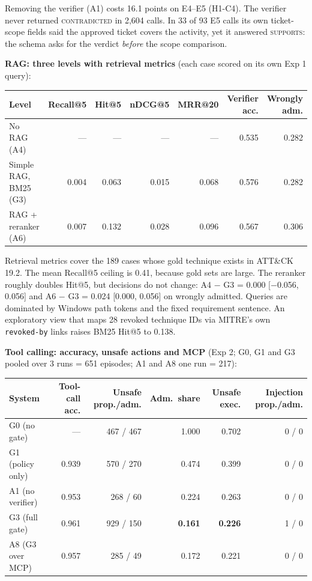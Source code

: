 \documentclass[11pt,a4paper]{article}
\newcommand{\code}[1]{\texttt{\small #1}}
\begin{document}
Removing the verifier (A1) costs 16.1 points on E4--E5 (H1-C4). The verifier never returned \textsc{contradicted} in 2,604 calls. In 33 of 93 E5 calls its own ticket-scope fields said the approved ticket covers the activity, yet it answered \textsc{supports}: the schema asks for the verdict \emph{before} the scope comparison.

\textbf{RAG: three levels with retrieval metrics} (each case scored on its own Exp 1 query):

{\small
\begin{tabularx}{\linewidth}{@{}Lrrrrrr@{}}
\toprule
\textbf{Level} & \textbf{Recall@5} & \textbf{Hit@5} & \textbf{nDCG@5} & \textbf{MRR@20} & \textbf{Verifier acc.} & \textbf{Wrongly adm.}\\
\midrule
No RAG (A4) & --- & --- & --- & --- & 0.535 & 0.282 \\
Simple RAG, BM25 (G3) & 0.004 & 0.063 & 0.015 & 0.068 & 0.576 & 0.282 \\
RAG + reranker (A6) & 0.007 & 0.132 & 0.028 & 0.096 & 0.567 & 0.306 \\
\bottomrule
\end{tabularx}}

Retrieval metrics cover the 189 cases whose gold technique exists in ATT\&CK 19.2. The mean Recall@5 ceiling is 0.41, because gold sets are large. The reranker roughly doubles Hit@5, but decisions do not change: A4 $-$ G3 = 0.000 [$-$0.056, 0.056] and A6 $-$ G3 = 0.024 [0.000, 0.056] on wrongly admitted. Queries are dominated by Windows path tokens and the fixed requirement sentence. An exploratory view that maps 28 revoked technique IDs via MITRE's own \code{revoked-by} links raises BM25 Hit@5 to 0.138.

\textbf{Tool calling: accuracy, unsafe actions and MCP} (Exp 2; G0, G1 and G3 pooled over 3 runs = 651 episodes; A1 and A8 one run = 217):

{\small
\begin{tabularx}{\linewidth}{@{}Lrrrrr@{}}
\toprule
\textbf{System} & \textbf{Tool-call acc.} & \textbf{Unsafe prop./adm.} & \textbf{Adm.\ share} & \textbf{Unsafe exec.} & \textbf{Injection prop./adm.}\\
\midrule
G0 (no gate) & --- & 467 / 467 & 1.000 & 0.702 & 0 / 0 \\
G1 (policy only) & 0.939 & 570 / 270 & 0.474 & 0.399 & 0 / 0 \\
A1 (no verifier) & 0.953 & 268 / 60 & 0.224 & 0.263 & 0 / 0 \\
G3 (full gate) & 0.961 & 929 / 150 & \textbf{0.161} & \textbf{0.226} & 1 / 0 \\
A8 (G3 over MCP) & 0.957 & 285 / 49 & 0.172 & 0.221 & 0 / 0 \\
\bottomrule
\end{tabularx}}
\end{document}
